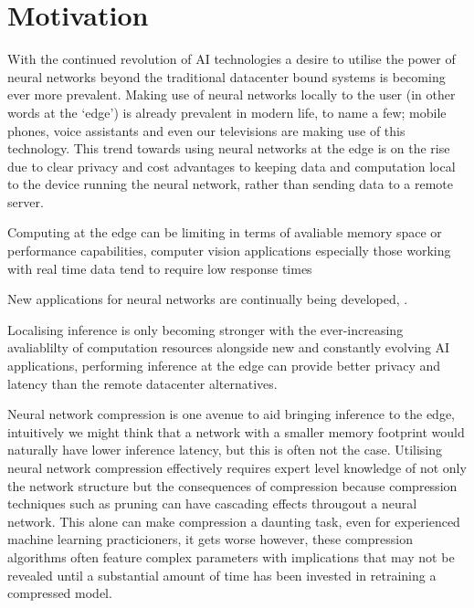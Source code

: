 \documentclass[../Dissertation.tex]{subfiles}
\begin{document}
\section{Motivation}
With the continued revolution of AI technologies a desire to utilise the power of neural networks beyond the traditional datacenter bound systems is becoming ever more prevalent.
Making use of neural networks locally to the user (in other words at the `edge') is already prevalent in modern life, to name a few; mobile phones, voice assistants and even our televisions are making use of this technology. 
This trend towards using neural networks at the edge is on the rise due to clear privacy and cost advantages to keeping data and computation local to the device running the neural network, rather than sending data to a remote server.

Computing at the edge can be limiting in terms of avaliable memory space or performance capabilities, computer vision applications especially those working with real time data tend to require low response times

New applications for neural networks are continually being developed, .

Localising inference is only becoming stronger with the ever-increasing avaliablilty of computation resources alongside new and constantly evolving AI applications, performing inference at the edge can provide better privacy and latency than the remote datacenter alternatives.



Neural network compression is one avenue to aid bringing inference to the edge, intuitively we might think that a network with a smaller memory footprint would naturally have lower inference latency, but this is often not the case.
Utilising neural network compression effectively requires expert level knowledge of not only the network structure but the consequences of compression because compression techniques such as pruning can have cascading effects througout a neural network.
This alone can make compression a daunting task, even for experienced machine learning practicioners, it gets worse however, these compression algorithms often feature complex parameters with implications that may not be revealed until a substantial amount of time has been invested in retraining a compressed model.
\end{document}
